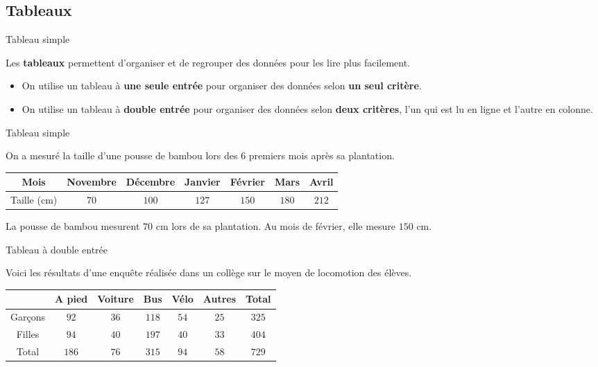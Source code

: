 \begin{pageCours} 

\section{Tableaux}

\begin{DefT}{Tableau simple}

Les \textbf{tableaux} permettent d'organiser et de regrouper des données pour les lire plus facilement.
\begin{itemize}
\item On utilise un tableau à \textbf{une seule entrée} pour organiser des données selon \textbf{un seul critère}.
\item On utilise un tableau à \textbf{double entrée} pour organiser des données selon \textbf{deux critères}, l'un qui est lu en ligne et l'autre en colonne.
\end{itemize}

\end{DefT}


\begin{Ex}{Tableau simple}

On a mesuré la taille d'une pousse de bambou lors des 6 premiers mois après sa plantation.
 \begin{center}
 \begin{tabular}{|c|c|c|c|c|c|c|} 
  \hline
  Mois & Novembre & Décembre & Janvier  & Février & Mars & Avril \\
  \hline
  Taille (cm) & $70$ & $100$ & $127$ & $150$ & $180$ & $212$  \\
  \hline
 \end{tabular}
 \end{center}

La pousse de bambou mesurent $70$ cm lors de sa plantation. Au mois de février, elle mesure $150$ cm.
\end{Ex}


\begin{Ex}{Tableau à double entrée}

	Voici les résultats d'une enquête réalisée dans un collège sur le moyen de locomotion des élèves.

 \begin{center}
 \begin{tabular}{|c|c|c|c|c|c|c|}
  & A pied & Voiture & Bus &  Vélo & Autres & Total \\  \hline
  Garçons & $92$ & $36$ & $118$ & $54$ & $25$ & $325$  \\\hline
  Filles &  $94$ & $40$ & $197$ & $40$ & $33$ & $404$ \\\hline
  Total & $186$ & $76$ & $315$& $94$ & $58$ & $729$ \\
 \end{tabular}
 \end{center}
 

\end{Ex}
\end{pageCours}
